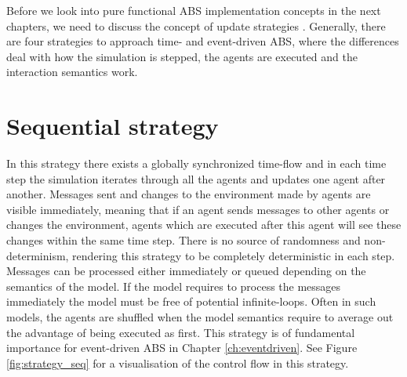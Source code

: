 Before we look into pure functional ABS implementation concepts in the next chapters, we need to discuss the concept of update strategies \cite{thaler_art_2017}. Generally, there are four strategies to approach time- and event-driven ABS, where the differences deal with how the simulation is stepped, the agents are executed and the interaction semantics work.


\section{Sequential strategy}
\label{sec:seq_strategy}
In this strategy there exists a globally synchronized time-flow and in each time step the simulation iterates through all the agents and updates one agent after another. Messages sent and changes to the environment made by agents are visible immediately, meaning that if an agent sends messages to other agents or changes the environment, agents which are executed after this agent will see these changes within the same time step. There is no source of randomness and non-determinism, rendering this strategy to be completely deterministic in each step. Messages can be processed either immediately or queued depending on the semantics of the model. If the model requires to process the messages immediately the model must be free of potential infinite-loops. Often in such models, the agents are shuffled when the model semantics require to average out the advantage of being executed as first. This strategy is of fundamental importance for event-driven ABS in Chapter \ref{ch:eventdriven}. See Figure \ref{fig:strategy_seq} for a visualisation of the control flow in this strategy.

